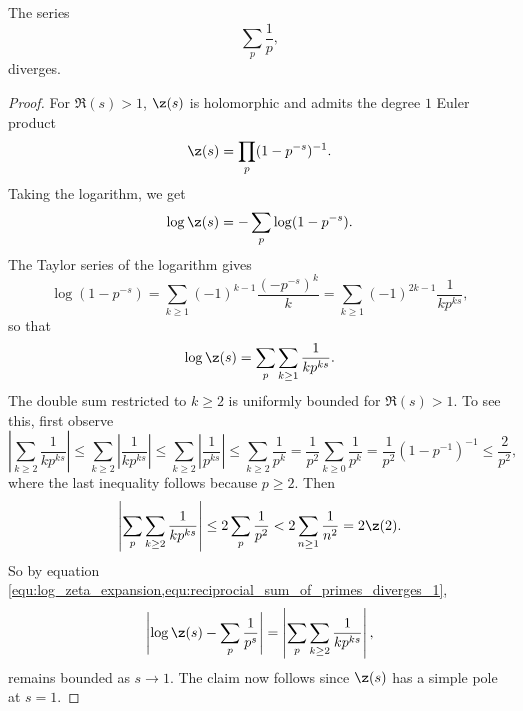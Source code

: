       \begin{theorem}\label{thm:reciprocial_sum_of_primes_diverges}
        The series
        \[
          \sum_{p}\frac{1}{p},
        \]
        diverges.
      \end{theorem}
      \begin{proof}
        For $\Re(s) > 1$, $\z(s)$ is holomorphic and admits the degree $1$ Euler product
        \[
          \z(s) = \prod_{p}(1-p^{-s})^{-1}.
        \]
        Taking the logarithm, we get
        \[
          \log\z(s) = -\sum_{p}\log(1-p^{-s}).
        \]
        The Taylor series of the logarithm gives
        \[
          \log(1-p^{-s}) = \sum_{k \ge 1}(-1)^{k-1}\frac{(-p^{-s})^{k}}{k} = \sum_{k \ge 1}(-1)^{2k-1}\frac{1}{kp^{ks}},
        \]
        so that
        \begin{equation}\label{equ:log_zeta_expansion}
          \log\z(s) = \sum_{p}\sum_{k \ge 1}\frac{1}{kp^{ks}}.
        \end{equation}
        The double sum restricted to $k \ge 2$ is uniformly bounded for $\Re(s) > 1$. To see this, first observe
        \[
          \left|\sum_{k \ge 2}\frac{1}{kp^{ks}}\right| \le \sum_{k \ge 2}\left|\frac{1}{kp^{ks}}\right| \le \sum_{k \ge 2}\left|\frac{1}{p^{ks}}\right| \le \sum_{k \ge 2}\frac{1}{p^{k}} = \frac{1}{p^{2}}\sum_{k \ge 0}\frac{1}{p^{k}} = \frac{1}{p^{2}}(1-p^{-1})^{-1} \le \frac{2}{p^{2}},
        \]
        where the last inequality follows because $p \ge 2$. Then
        \begin{equation}\label{equ:reciprocial_sum_of_primes_diverges_1}
          \left|\sum_{p}\sum_{k \ge 2}\frac{1}{kp^{ks}}\right| \le 2\sum_{p}\frac{1}{p^{2}} < 2\sum_{n \ge 1}\frac{1}{n^{2}} = 2\z(2).
        \end{equation}
        So by equation \cref{equ:log_zeta_expansion,equ:reciprocial_sum_of_primes_diverges_1},
        \[
          \left|\log\z(s)-\sum_{p}\frac{1}{p^{s}}\right| = \left|\sum_{p}\sum_{k \ge 2}\frac{1}{kp^{ks}}\right|,
        \]
        remains bounded as $s \to 1$. The claim now follows since $\z(s)$ has a simple pole at $s = 1$.
      \end{proof}

